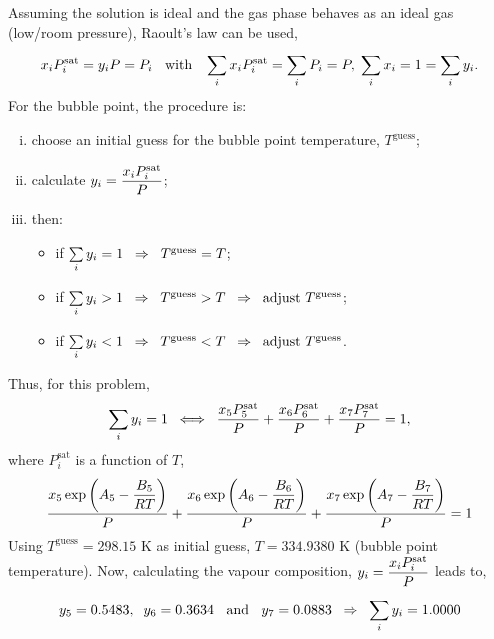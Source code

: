 \begin{enumerate}[1)]
  Assuming the solution is ideal and the gas phase behaves as an ideal gas (\ie low/room pressure), Raoult's law can be used,
    \begin{displaymath}
       x_{i}P_{i}^{\text{sat}} = y_{i}P = P_{i} \;\;\text{ with }\;\; \summation[x_{i}P_{i}^{\text{sat}}]{i}{} = \summation[P_{i}]{i}{} = P, \;\summation[x_{i}]{i}{}=1=\summation[y_{i}]{i}{}.
    \end{displaymath}
    For the bubble point, the procedure is:
    \begin{enumerate}[i)]
       \item choose an initial guess for the bubble point temperature, $T^{\text{guess}}$;
       \item calculate $y_{i}=\frc{x_{i}P_{i}^{\text{sat}}}{P}$;
       \item then:
           \begin{itemize}
              \item if $\summation[y_{i}]{i}{} = 1 \;\;\Rightarrow \;\; T^{\text{guess}} = T$;
              \item if $\summation[y_{i}]{i}{} > 1 \;\;\Rightarrow \;\; T^{\text{guess}} > T \;\; \Rightarrow\;\; \text{adjust } T^{\text{guess}}$;
              \item if $\summation[y_{i}]{i}{} < 1 \;\;\Rightarrow \;\; T^{\text{guess}} < T \;\; \Rightarrow\;\; \text{adjust } T^{\text{guess}}$.
           \end{itemize}
    \end{enumerate}
    Thus, for this problem,
    \begin{displaymath}
        \summation[y_{i}]{i}{} = 1\;\; \Longleftrightarrow \;\; \frc{x_{5}P_{5}^{\text{sat}}}{P} + \frc{x_{6}P_{6}^{\text{sat}}}{P} + \frc{x_{7}P_{7}^{\text{sat}}}{P} = 1,
    \end{displaymath}
    where $P_{i}^{\text{sat}}$ is a function of $T$, 
    \begin{displaymath}
        \frc{x_{5}\exp{\left(A_{5}-\frc{B_{5}}{RT}\right)}}{P} + \frc{x_{6}\exp{\left(A_{6}-\frc{B_{6}}{RT}\right)}}{P} + \frc{x_{7}\exp{\left(A_{7}-\frc{B_{7}}{RT}\right)}}{P} = 1
    \end{displaymath}
    Using $T^{\text{guess}}=298.15$ K as initial guess, $T=334.9380$ K (bubble point temperature). Now, calculating the vapour composition, $y_{i}=\frc{x_{i}P_{i}^{\text{sat}}}{P}$ leads to,
    \begin{displaymath}
        y_{5} =0.5483,\;\; y_{6} = 0.3634\;\;\text{ and }\;\;y_{7} = 0.0883\;\;\Rightarrow\;\; \summation[y_{i}]{i}{} = 1.0000
    \end{displaymath}


\end{enumerate}
